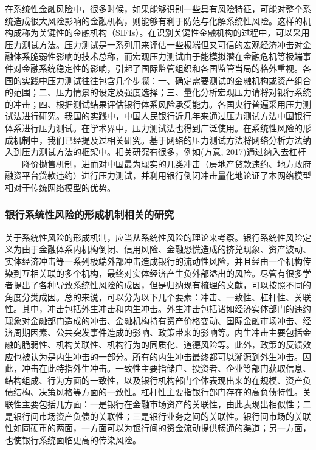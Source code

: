 在系统性金融风险中，很多时候，如果能够识别一些具有风险特征，可能对整个系统造成很大风险影响的金融机构，则能够有利于防范与化解系统性风险。这样的机构成称为关键性的金融机构（SIFIs）。在识别关键性金融机构的过程中，可以采用压力测试方法。压力测试是一系列用来评估一些极端但又可信的宏观经济冲击对金融体系脆弱性影响的技术总称，而宏观压力测试由于能模拟潜在金融危机等极端事件对金融系统稳定性的影响，引起了国际监管组织和各国监管当局的格外重视。各国的实践中压力测试往往包含几个步骤：一、确定需要测试的金融机构或资产组合的范围；二、压力情景的设定及强度选择；三、量化分析宏观压力请将对银行系统的冲击；四、根据测试结果评估银行体系风险承受能力。各国央行普遍采用压力测试法进行研究。我国的实践中，中国人民银行近几年来通过压力测试方法中国银行体系进行压力测试。在学术界中，压力测试法也得到广泛使用。在系统性风险的形成机制中，我们已经提及过相关研究。基于网络的压力测试方法将网络分析方法纳入到压力测试方法的框架中。相关研究有很多，例如(方意, 2017)通过纳入去杠杆——降价抛售机制，进而对中国最为现实的几类冲击（房地产贷款违约、地方政府融资平台贷款违约）进行压力测试，并利用银行倒闭冲击量化地论证了本网络模型相对于传统网络模型的优势。


\subsubsection{银行系统性风险的形成机制相关的研究}

关于系统性风险的形成机制，应当从系统性风险的理论来考察。银行系统性风险定义为由于金融体系内机构倒闭、信用风险、金融恐慌造成的挤兑现象、资产波动、实体经济冲击等一系列极端外部冲击造成银行的流动性风险，并且经由一个机构传染到互相关联的多个机构，最终对实体经济产生负外部溢出的风险。尽管有很多学者提出了各种导致系统性风险的成因，但是归纳现有梳理的文献，可以按照不同的角度分类成因。总的来说，可以分为以下几个要素：冲击、一致性、杠杆性、关联性。其中，冲击包括外生冲击和内生冲击。外生冲击包括诸如经济实体部门的违约现象对金融部门造成的冲击、金融机构持有资产价格变动、国际金融市场冲击、经济周期因素、公共突发事件造成的影响、政策带来的影响等。内生冲击主要包括金融的脆弱性、机构关联性、机构行为的同质化、道德风险等。此外，政策的反馈效应也被认为是内生冲击的一部分。所有的内生冲击最终都可以溯源到外生冲击。因此，冲击在此特指外生冲击。一致性主要指储户、投资者、企业等部门获取信息、结构组成、行为方面的一致性，以及银行机构部门个体表现出来的在规模、资产负债结构、决策风格等方面的一致性。杠杆性主要指银行部门存在的高负债特性。关联性主要包括几方面：一是银行在金融市场资产的关联性，由此表现出相似性；二是银行间市场资产负债的关联性；三是银行业务之间的关联性。银行间市场的关联性如同硬币的两面，一方面可以为银行间的资金流动提供畅通的渠道；另一方面，也使银行系统面临更高的传染风险。

